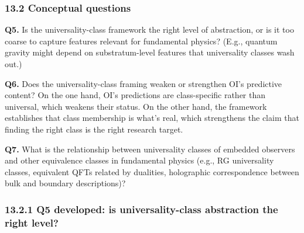 \documentclass[
]{article}
\begin{document}
\hypertarget{conceptual-questions}{%
\subsubsection{13.2 Conceptual questions}\label{conceptual-questions}}

\textbf{Q5.} Is the universality-class framework the right level of
abstraction, or is it too coarse to capture features relevant for
fundamental physics? (E.g., quantum gravity might depend on
substratum-level features that universality classes wash out.)

\textbf{Q6.} Does the universality-class framing weaken or strengthen
OI's predictive content? On the one hand, OI's predictions are
class-specific rather than universal, which weakens their status. On the
other hand, the framework establishes that class membership is what's
real, which strengthens the claim that finding the right class is the
right research target.

\textbf{Q7.} What is the relationship between universality classes of
embedded observers and other equivalence classes in fundamental physics
(e.g., RG universality classes, equivalent QFTs related by dualities,
holographic correspondence between bulk and boundary descriptions)?

\hypertarget{q5-developed-is-universality-class-abstraction-the-right-level}{%
\subsubsection{13.2.1 Q5 developed: is universality-class abstraction
the right
level?}\label{q5-developed-is-universality-class-abstraction-the-right-level}}
\end{document}
